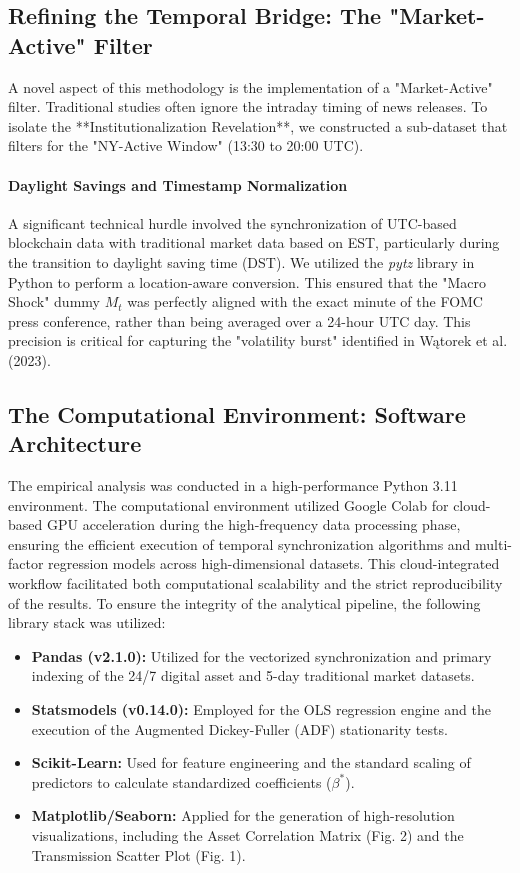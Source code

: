 \documentclass[10pt, conference, compsocconf]{IEEEtran}
\begin{document}
\subsection{Refining the Temporal Bridge: The "Market-Active" Filter}

A novel aspect of this methodology is the implementation of a "Market-Active" filter. Traditional studies often ignore the intraday timing of news releases. To isolate the **Institutionalization Revelation**, we constructed a sub-dataset that filters for the "NY-Active Window" (13:30 to 20:00 UTC).

\paragraph{Daylight Savings and Timestamp Normalization}
A significant technical hurdle involved the synchronization of UTC-based blockchain data with traditional market data based on EST, particularly during the transition to daylight saving time (DST). We utilized the \textit{pytz} library in Python to perform a location-aware conversion. This ensured that the "Macro Shock" dummy $M_t$ was perfectly aligned with the exact minute of the FOMC press conference, rather than being averaged over a 24-hour UTC day. This precision is critical for capturing the "volatility burst" identified in Wątorek et al. (2023).

\subsection{The Computational Environment: Software Architecture}

The empirical analysis was conducted in a high-performance Python 3.11 environment. The computational environment utilized Google Colab for cloud-based GPU acceleration during the high-frequency data processing phase, ensuring the efficient execution of temporal synchronization algorithms and multi-factor regression models across high-dimensional datasets. This cloud-integrated workflow facilitated both computational scalability and the strict reproducibility of the results. To ensure the integrity of the analytical pipeline, the following library stack was utilized:
\begin{itemize}
    \item \textbf{Pandas (v2.1.0):} Utilized for the vectorized synchronization and primary indexing of the 24/7 digital asset and 5-day traditional market datasets.
    \item \textbf{Statsmodels (v0.14.0):} Employed for the OLS regression engine and the execution of the Augmented Dickey-Fuller (ADF) stationarity tests.
    \item \textbf{Scikit-Learn:} Used for feature engineering and the standard scaling of predictors to calculate standardized coefficients ($\beta^*$).
    \item \textbf{Matplotlib/Seaborn:} Applied for the generation of high-resolution visualizations, including the Asset Correlation Matrix (Fig. 2) and the Transmission Scatter Plot (Fig. 1).
\end{itemize}
\end{document}
